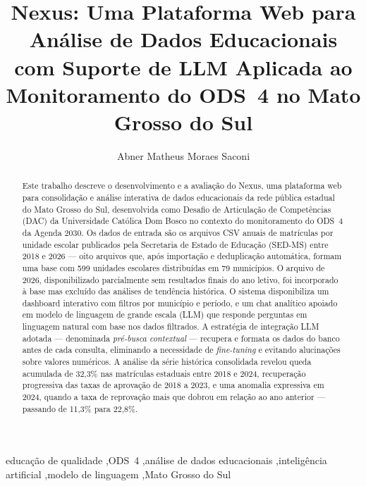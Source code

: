\documentclass[preprint,10pt,5p]{elsarticle}
\begin{document}
\begin{frontmatter}

\title{Nexus: Uma Plataforma Web para Análise de Dados Educacionais com Suporte de LLM
       Aplicada ao Monitoramento do ODS~4 no Mato Grosso do Sul}

\address[label1]{Universidade Católica Dom Bosco, Campo Grande, Brasil}

\author[label1]{Abner Matheus Moraes Saconi}

\begin{abstract}
Este trabalho descreve o desenvolvimento e a avaliação do Nexus, uma plataforma web para
consolidação e análise interativa de dados educacionais da rede pública estadual do
Mato Grosso do Sul, desenvolvida como Desafio de Articulação de Competências (DAC)
da Universidade Católica Dom Bosco no contexto do monitoramento do ODS~4 da Agenda 2030.
Os dados de entrada são os arquivos CSV anuais de matrículas por unidade escolar
publicados pela Secretaria de Estado de Educação (SED-MS) entre 2018 e 2026 — oito
arquivos que, após importação e deduplicação automática, formam uma base com 599 unidades
escolares distribuídas em 79 municípios. O arquivo de 2026, disponibilizado parcialmente
sem resultados finais do ano letivo, foi incorporado à base mas excluído das análises de
tendência histórica. O sistema disponibiliza um dashboard interativo
com filtros por município e período, e um chat analítico apoiado em modelo de linguagem
de grande escala (LLM) que responde perguntas em linguagem natural com base nos dados
filtrados. A estratégia de integração LLM adotada — denominada \textit{pré-busca contextual}
— recupera e formata os dados do banco antes de cada consulta, eliminando a necessidade de
\textit{fine-tuning} e evitando alucinações sobre valores numéricos. A análise da série
histórica consolidada revelou queda acumulada de 32,3\% nas matrículas estaduais entre 2018
e 2024, recuperação progressiva das taxas de aprovação de 2018 a 2023, e uma anomalia
expressiva em 2024, quando a taxa de reprovação mais que dobrou em relação ao ano anterior
— passando de 11,3\% para 22,8\%.
\end{abstract}

\begin{keyword}
educação de qualidade \sep ODS~4 \sep análise de dados educacionais \sep inteligência
artificial \sep modelo de linguagem \sep Mato Grosso do Sul
\end{keyword}

\end{frontmatter}
\end{document}
